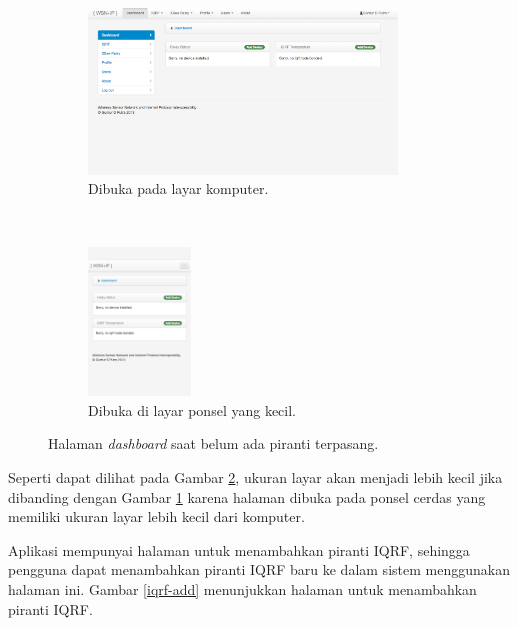 				\begin{figure}[H]
					\begin{subfigure}[b]{\textwidth}
						\centering
					    \includegraphics[width=0.9\textwidth]{gambar/dashboard}
					    \caption{Dibuka pada layar komputer.}
					    \label{dashboard-full-page}
					\end{subfigure}
					 ~
					\begin{subfigure}[b]{\textwidth}
						\centering
					    \includegraphics[width=0.3\textwidth]{gambar/dashboard-small}
					    \caption{Dibuka di layar ponsel yang kecil.}
					    \label{dashboard-small}
					\end{subfigure}
					\caption{Halaman \emph{dashboard} saat belum ada piranti terpasang.}
					\label{dashboard}
				\end{figure}

			Seperti dapat dilihat pada Gambar \ref{dashboard-small}, ukuran layar akan menjadi lebih kecil jika dibanding dengan Gambar \ref{dashboard-full-page} karena halaman dibuka pada ponsel cerdas yang memiliki ukuran layar lebih kecil dari komputer.

			Aplikasi mempunyai halaman untuk menambahkan piranti IQRF, sehingga pengguna dapat menambahkan piranti IQRF baru ke dalam sistem menggunakan halaman ini. Gambar \ref{iqrf-add} menunjukkan halaman untuk menambahkan piranti IQRF.

